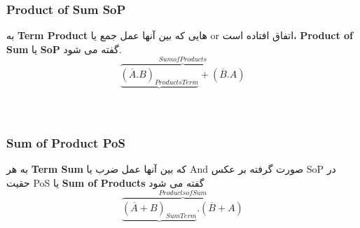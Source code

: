 \documentclass[20pt, a4paper]{article}
\begin{document}
\raggedleft
\justifying
\subsubsection{Product of Sum SoP}
	به \textbf{Term Product }هایی که بین آنها عمل جمع یا or اتفاق افتاده است، \textbf{Product of Sum }یا \textbf{SoP} گفته می شود.\\

\begin{equation}
	\overbrace{\underbrace{(\overline{A}.B)_{Products Term}} + (\overline{B}.A)}^{Sum of Products}
\end{equation}

\begin{LTR}
	\begin{equation}
		[\bar{X}.\bar{Y}.Z + W + \bar{a}.b.c]
	\end{equation}
	\begin{equation}
		[W + \bar{X}.Z.Y + \bar{y}.z]
	\end{equation}

	\begin{equation}
		[\bar{X}.Y.Z + W.(A+B)]
	\end{equation}

	\begin{equation}
		[X.Y + \bar{\bar{Y}.Z}]
	\end{equation}
\end{LTR}

\subsubsection{Sum of Product PoS}
	به هر \textbf{Term Sum} که بین آنها عمل ضرب یا And صورت گرفته بر عکس	 SoP در حقیت PoS یا\textbf{ Sum of Products }گفته می شود\\
\begin{equation}
	\overbrace{\underbrace{(\overline{A}+B)_{Sum Term}} . (\overline{B}+A)}^{Products of Sum}
\end{equation}

\begin{LTR}
		\begin{equation}
			[(X+\bar{Y}+Z).(\bar{W}+Z).(A)]
		\end{equation}

		\begin{equation}
			[\bar{Z}.(X+Y).(\bar{W}+Y)]
		\end{equation}

		\begin{equation}
			[(\bar{X}+Y.(X+W))]
		\end{equation}

		\begin{equation}
			[(X+Y).\bar{(X+Z)}]
		\end{equation}
\end{LTR}
\end{document}
